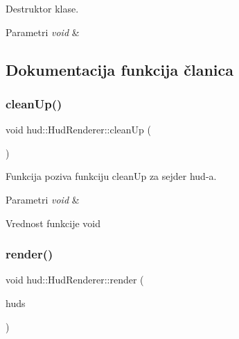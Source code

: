 Destruktor klase. 


\begin{DoxyParams}{Parametri}
{\em void} & \\
\hline
\end{DoxyParams}


\subsection{Dokumentacija funkcija članica}
\mbox{\label{classhud_1_1HudRenderer_a17ec594190149eee1db61bed6034daae}} 
\subsubsection{\texorpdfstring{clean\+Up()}{cleanUp()}}
{\footnotesize\ttfamily void hud\+::\+Hud\+Renderer\+::clean\+Up (\begin{DoxyParamCaption}\item[{void}]{ }\end{DoxyParamCaption})}



Funkcija poziva funkciju clean\+Up za sejder hud-\/a. 


\begin{DoxyParams}{Parametri}
{\em void} & \\
\hline
\end{DoxyParams}
\begin{DoxyReturn}{Vrednost funkcije}
void 
\end{DoxyReturn}
\mbox{\label{classhud_1_1HudRenderer_a9b64ac407d7e3f8fa9de46ee7f32fd17}} 
\subsubsection{\texorpdfstring{render()}{render()}}
{\footnotesize\ttfamily void hud\+::\+Hud\+Renderer\+::render (\begin{DoxyParamCaption}\item[{vector$<$ \hyperlink{classhud_1_1HudTexture}{Hud\+Texture} $\ast$$>$}]{huds }\end{DoxyParamCaption})}



